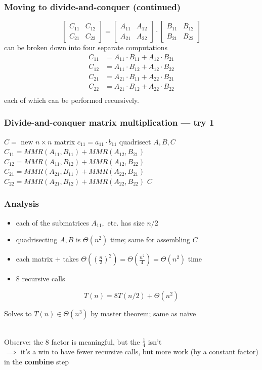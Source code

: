 \documentclass{beamer}
\newcommand{\stanza}{ \\~\ }
\begin{document}
\begin{frame} \frametitle{Moving to divide-and-conquer (continued)}
\[ \begin{bmatrix} C_{11} & C_{12} \\ C_{21} & C_{22} \end{bmatrix}
   =
   \begin{bmatrix} A_{11} & A_{12} \\ A_{21} & A_{22} \end{bmatrix}
   \cdot
   \begin{bmatrix} B_{11} & B_{12} \\ B_{21} & B_{22} \end{bmatrix} \]
can be broken down into four separate computations
\begin{align*}
  C_{11} &= A_{11} \cdot B_{11} + A_{12} \cdot B_{21} \\
  C_{12} &= A_{11} \cdot B_{12} + A_{12} \cdot B_{22} \\
  C_{21} &= A_{21} \cdot B_{11} + A_{22} \cdot B_{21} \\
  C_{22} &= A_{21} \cdot B_{12} + A_{22} \cdot B_{22} \\
\end{align*}
each of which can be performed recursively.
\end{frame}

\begin{frame} \frametitle{Divide-and-conquer matrix multiplication --- try 1}
  {
  \begin{algorithmic}[1]
    \State $C = $ new $n \times n$ matrix
      \State $c_{11} = a_{11} \cdot b_{11}$
    \Else
      \State quadrisect $A, B, C$
      \State $C_{11} = MMR(A_{11}, B_{11}) + MMR(A_{12}, B_{21})$
      \State $C_{12} = MMR(A_{11}, B_{12}) + MMR(A_{12}, B_{22})$
      \State $C_{21} = MMR(A_{21}, B_{11}) + MMR(A_{22}, B_{21})$
      \State $C_{22} = MMR(A_{21}, B_{12}) + MMR(A_{22}, B_{22})$
    \EndIf
    \State \Return $C$
    \EndFunction
  \end{algorithmic}
  }
\end{frame}

\begin{frame} \frametitle{Analysis}
\begin{itemize}
  \item each of the submatrices $A_{11},$ etc. has size $n/2$
  \item quadrisecting $A, B$ is $\Theta(n^2)$ time; same for assembling $C$
  \item each matrix $+$ takes $\Theta( (\frac{n}{2})^2 ) = \Theta(\frac{n^2}{4}) = \Theta(n^2)$ time
  \item 8 recursive calls
\end{itemize}
\[ T(n) = 8 T(n/2) + \Theta(n^2) \]

Solves to $T(n) \in \Theta(n^3)$ by master theorem; same as na\"ive \stanza

Observe: the 8 factor is meaningful, but the $\frac{1}{4}$ isn't \\
$\implies$ it's a win to have fewer recursive calls, but more work (by a
constant factor) in the \textbf{combine} step
\end{frame}
\end{document}
